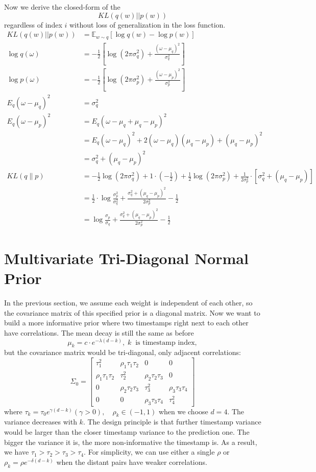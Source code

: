 \documentclass{article}
\begin{document}
Now we derive the closed-form of the $$KL(q(w)||p(w))$$ regardless of index $i$ without loss of generalization in the loss function.
$$
\begin{aligned}
KL(q(w)||p(w)) &= \mathbb{E}_{w \sim q}[\log q(w)-\log p(w)]\\
\log q(\omega) & =-\frac{1}{2}\left[\log \left(2 \pi \sigma_q^2\right)+\frac{\left(\omega-\mu_q\right)^2}{\sigma_q^2}\right] \\
\log p(\omega) & =-\frac{1}{2}\left[\log \left(2 \pi \sigma_p^2\right)+\frac{\left(\omega-\mu_p\right)^2}{\sigma_p^2}\right] \\
E_q\left(\omega-\mu_q\right)^2 & =\sigma_q^2 \\
E_q\left(\omega-\mu_p\right)^2 & =E_q\left(\omega-\mu_q+\mu_q-\mu_p\right)^2 \\
& =E_q\left(\omega-\mu_q\right)^2+2\left(\omega-\mu_q\right)\left(\mu_q-\mu_p\right)+\left(\mu_q-\mu_p\right)^2 \\
& =\sigma_q^2+\left(\mu_q-\mu_p\right)^2 \\
K L(q \| p) & =-\frac{1}{2} \log \left(2 \pi \sigma_q^2\right)+1 \cdot\left(-\frac{1}{2}\right)+\frac{1}{2} \log \left(2 \pi \sigma_p^2\right)+\frac{1}{2 \sigma_p^2} \cdot\left[\sigma_q^2+\left(\mu_q-\mu_p\right)\right] \\
& =\frac{1}{2} \cdot \log \frac{\sigma_p^2}{\sigma_q^2}+\frac{\sigma_q^2+\left(\mu_q-\mu_p\right)^2}{2 \sigma_p^2}-\frac{1}{2} \\
& =\log \frac{\sigma_p}{\sigma_q}+\frac{\sigma_q^2+\left(\mu_q-\mu_p\right)^2}{2 \sigma_p^2}-\frac{1}{2}
\end{aligned}
$$

\section{Multivariate Tri-Diagonal Normal Prior}
In the previous section, we assume each weight is independent of each other, so the covariance matrix of this specified prior is a diagonal matrix. Now we want to build a more informative prior where two timestamps right next to each other have correlations. The mean decay is still the same as before $$\mu_k = c\cdot e^{-\lambda (d-k)}, \;k \;\;\text{is timestamp index},$$ but the covariance matrix would be tri-diagonal, only adjacent correlations: $$\Sigma_0=\left[\begin{array}{cccc}
\tau_1^2 & \rho_1 \tau_1 \tau_2 & 0 & 0 \\
\rho_1 \tau_1 \tau_2 & \tau_2^2 & \rho_2 \tau_2 \tau_3 & 0 \\
0 & \rho_2 \tau_2 \tau_3 & \tau_3^2 & \rho_3 \tau_3 \tau_4 \\
0 & 0 & \rho_3 \tau_3 \tau_4 & \tau_4^2
\end{array}\right]$$ where $\tau_k=\tau_0 e^{\gamma(d-k)}(\gamma>0), \quad \rho_k \in(-1,1)$ when we choose $d=4$. The variance decreases with $k$. The design principle is that further timestamp variance would be larger than the closer timestamp variance to the prediction one. The bigger the variance it is, the more non-informative the timestamp is. As a result, we have $\tau_1>\tau_2>\tau_3>\tau_4$. For simplicity, we can use either a single $\rho$ or $\rho_k=\rho e^{-\delta(d-k)}$ when the distant pairs have weaker correlations. 
\end{document}
